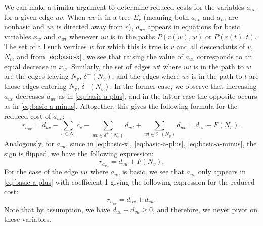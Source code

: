 \documentclass[titlepage,11pt]{article}
\begin{document}
We can make a similar argument to determine reduced costs for the variables $a_{uv}$ for a given edge $uv$. When $uv$ is in a tree $E_r$ (meaning both $a_{uv}$ and $a_{vu}$ are nonbasic and $uv$ is directed away from $r$), $a_{uv}$ appears in equations for basic variables $x_{w}$ and $a_{wt}$ whenever $uv$ is in the paths $P(r(w), w)$ or $P(r(t), t)$. The set of all such vertices $w$ for which this is true is $v$ and all descendants of $v$, $N_v$, and from $\eqref{eq:basic-x}$, we see that raising the value of $a_{uv}$ corresponds to an equal decrease in $x_w$. Similarly, the set of edges $wt$ where $uv$ is in the path to $w$ are the edges leaving $N_v$, $\delta^+(N_v)$, and the edges where $uv$ is in the path to $t$ are those edges entering $N_v$, $\delta^-(N_v)$. In the former case, we observe that increasing $a_{uv}$ decreases $a_{wt}$ as in \eqref{eq:basic-a-plus}, and in the latter case the opposite occurs as in \eqref{eq:basic-a-minus}. Altogether, this gives the following formula for the reduced cost of $a_{uv}$:
\begin{equation}\label{eq:reduced-cost-edge-plus}
    r_{a_{uv}} = d_{uv} - \sum_{v \in N_v}c_v - \sum_{wt \in \delta^+(N_v)}d_{wt} + \sum_{wt \in \delta^-(N_v)}d_{wt} = d_{uv} - F(N_v). 
\end{equation}
Analogously, for $a_{vu}$, since in \eqref{eq:basic-x}, \eqref{eq:basic-a-plus}, \eqref{eq:basic-a-minus}, the sign is flipped, we have the following expression:
\begin{equation}\label{eq:reduced-cost-edge-minus}
    r_{a_{vu}} = d_{vu} + F(N_v). 
\end{equation}
For the case of the edge $vu$ where $a_{uv}$ is basic, we see that $a_{uv}$ only appears in \eqref{eq:basic-a-plus} with coefficient 1 giving the following expression for the reduced cost:
\begin{equation}\label{eq:reduced-cost-basic-edge}
    r_{a_{uv}} = d_{uv} + d_{vu}.
\end{equation}
Note that by assumption, we have $d_{uv} + d_{vu} \ge 0$, and therefore, we never pivot on these variables.

\end{document}
